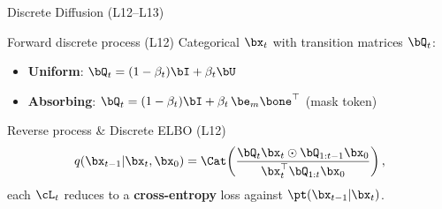 \documentclass{beamer}
\begin{document}
\begin{frame}{Discrete Diffusion (L12--L13)}
	\begin{block}{Forward discrete process (L12)}
		Categorical $\bx_t$ with transition matrices $\bQ_t$:
		\begin{itemize}
			\item \textbf{Uniform}: $\bQ_t = (1-\beta_t)\bI + \beta_t\bU$
			\item \textbf{Absorbing}: $\bQ_t = (1-\beta_t)\bI + \beta_t\,\be_m \bone^{\top}$ (mask token)
		\end{itemize}
	\end{block}
	\begin{block}{Reverse process \& Discrete ELBO (L12)}
		\vspace{-0.3cm}
		\[
			q(\bx_{t-1}|\bx_t,\bx_0)=\Cat\!\left(\frac{\bQ_t \bx_t \odot \bQ_{1:t-1}\bx_0}{\bx_t^{\top}\bQ_{1:t}\bx_0}\right),
		\]
		each $\cL_t$ reduces to a \textbf{cross-entropy} loss against $\pt(\bx_{t-1}|\bx_t)$.
	\end{block}
\end{frame}
\end{document}
